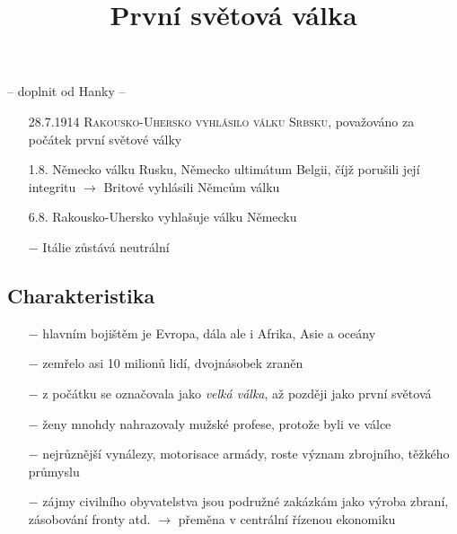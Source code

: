 \documentclass{article}
\title{\vspace{-2cm}První světová válka\vspace{-1.7cm}}
\date{}
\author{}
\begin{document}
\maketitle

-- doplnit od Hanky --

\begin{itemize}
    \vspace{-0.5em}
    \setlength\itemsep{0.15em}
    \item[28.7.1914] \textsc{Rakousko-Uhersko vyhlásilo válku Srbsku}, považováno za počátek první světové války
    \item[1.8.] Německo válku Rusku, Německo ultimátum Belgii, číjž porušili její integritu $\rightarrow$ Britové vyhlásili Němcům válku
    \item[6.8.] Rakousko-Uhersko vyhlašuje válku Německu
    \item[$-$] Itálie zůstává neutrální
\end{itemize}

\subsection*{Charakteristika}
\begin{itemize}
    \vspace{-0.5em}
    \setlength\itemsep{0.15em}
    \item[$-$] hlavním bojištěm je Evropa, dála ale i Afrika, Asie a oceány
    \item[$-$] zemřelo asi 10 milionů lidí, dvojnásobek zraněn
    \item[$-$] z počátku se označovala jako \textit{velká válka}, až později jako první světová
    \item[$-$] ženy mnohdy nahrazovaly mužské profese, protože byli ve válce
    \item[$-$] nejrůznější vynálezy, motorisace armády, roste význam zbrojního, těžkého průmyslu
    \item[$-$] zájmy civilního obyvatelstva jsou podružné zakázkám jako výroba zbraní, zásobování fronty atd. $\rightarrow$ přeměna v centrální řízenou ekonomiku
\end{itemize}
\end{document}
